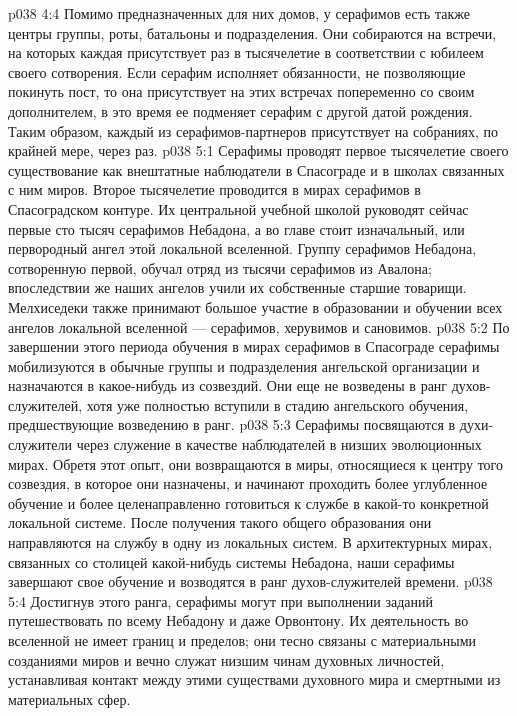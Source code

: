 \vs p038 4:4 Помимо предназначенных для них домов, у серафимов есть также центры группы, роты, батальоны и подразделения. Они собираются на встречи, на которых каждая присутствует раз в тысячелетие в соответствии с юбилеем своего сотворения. Если серафим исполняет обязанности, не позволяющие покинуть пост, то она присутствует на этих встречах попеременно со своим дополнителем, в это время ее подменяет серафим с другой датой рождения. Таким образом, каждый из серафимов\hyp{}партнеров присутствует на собраниях, по крайней мере, через раз.
\vs p038 5:1 Серафимы проводят первое тысячелетие своего существование как внештатные наблюдатели в Спасограде и в школах связанных с ним миров. Второе тысячелетие проводится в мирах серафимов в Спасоградском контуре. Их центральной учебной школой руководят сейчас первые сто тысяч серафимов Небадона, а во главе стоит изначальный, или первородный ангел этой локальной вселенной. Группу серафимов Небадона, сотворенную первой, обучал отряд из тысячи серафимов из Авалона; впоследствии же наших ангелов учили их собственные старшие товарищи. Мелхиседеки также принимают большое участие в образовании и обучении всех ангелов локальной вселенной --- серафимов, херувимов и сановимов.
\vs p038 5:2 По завершении этого периода обучения в мирах серафимов в Спасограде серафимы мобилизуются в обычные группы и подразделения ангельской организации и назначаются в какое\hyp{}нибудь из созвездий. Они еще не возведены в ранг духов\hyp{}служителей, хотя уже полностью вступили в стадию ангельского обучения, предшествующие возведению в ранг.
\vs p038 5:3 Серафимы посвящаются в духи\hyp{}служители через служение в качестве наблюдателей в низших эволюционных мирах. Обретя этот опыт, они возвращаются в миры, относящиеся к центру того созвездия, в которое они назначены, и начинают проходить более углубленное обучение и более целенаправленно готовиться к службе в какой\hyp{}то конкретной локальной системе. После получения такого общего образования они направляются на службу в одну из локальных систем. В архитектурных мирах, связанных со столицей какой\hyp{}нибудь системы Небадона, наши серафимы завершают свое обучение и возводятся в ранг духов\hyp{}служителей времени.
\vs p038 5:4 Достигнув этого ранга, серафимы могут при выполнении заданий путешествовать по всему Небадону и даже Орвонтону. Их деятельность во вселенной не имеет границ и пределов; они тесно связаны с материальными созданиями миров и вечно служат низшим чинам духовных личностей, устанавливая контакт между этими существами духовного мира и смертными из материальных сфер.

